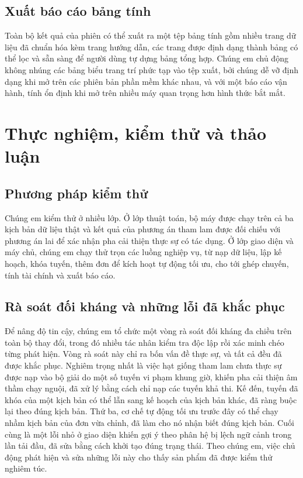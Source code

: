 \documentclass[12pt,a4paper,oneside]{report}
\begin{document}
\section{Xuất báo cáo bảng tính}
Toàn bộ kết quả của phiên có thể xuất ra một tệp bảng tính gồm nhiều trang dữ liệu đã chuẩn hóa kèm trang hướng dẫn, các trang được định dạng thành bảng có thể lọc và sẵn sàng để người dùng tự dựng bảng tổng hợp. Chúng em chủ động không nhúng các bảng biểu trang trí phức tạp vào tệp xuất, bởi chúng dễ vỡ định dạng khi mở trên các phiên bản phần mềm khác nhau, và với một báo cáo vận hành, tính ổn định khi mở trên nhiều máy quan trọng hơn hình thức bắt mắt.

\chapter{Thực nghiệm, kiểm thử và thảo luận}
\enlargethispage{2\baselineskip}

\section{Phương pháp kiểm thử}
Chúng em kiểm thử ở nhiều lớp. Ở lớp thuật toán, bộ máy được chạy trên cả ba kịch bản dữ liệu thật và kết quả của phương án tham lam được đối chiếu với phương án lai để xác nhận pha cải thiện thực sự có tác dụng. Ở lớp giao diện và máy chủ, chúng em chạy thử trọn các luồng nghiệp vụ, từ nạp dữ liệu, lập kế hoạch, khóa tuyến, thêm đơn để kích hoạt tự động tối ưu, cho tới ghép chuyến, tính tài chính và xuất báo cáo.

\section{Rà soát đối kháng và những lỗi đã khắc phục}
Để nâng độ tin cậy, chúng em tổ chức một vòng rà soát đối kháng đa chiều trên toàn bộ thay đổi, trong đó nhiều tác nhân kiểm tra độc lập rồi xác minh chéo từng phát hiện. Vòng rà soát này chỉ ra bốn vấn đề thực sự, và tất cả đều đã được khắc phục. Nghiêm trọng nhất là việc hạt giống tham lam chưa thực sự được nạp vào bộ giải do một số tuyến vi phạm khung giờ, khiến pha cải thiện âm thầm chạy nguội, đã xử lý bằng cách chỉ nạp các tuyến khả thi. Kế đến, tuyến đã khóa của một kịch bản có thể lẫn sang kế hoạch của kịch bản khác, đã ràng buộc lại theo đúng kịch bản. Thứ ba, cơ chế tự động tối ưu trước đây có thể chạy nhầm kịch bản của đơn vừa chỉnh, đã làm cho nó nhận biết đúng kịch bản. Cuối cùng là một lỗi nhỏ ở giao diện khiến gợi ý theo phân hệ bị lệch ngữ cảnh trong lần tải đầu, đã sửa bằng cách khởi tạo đúng trạng thái. Theo chúng em, việc chủ động phát hiện và sửa những lỗi này cho thấy sản phẩm đã được kiểm thử nghiêm túc.
\end{document}
